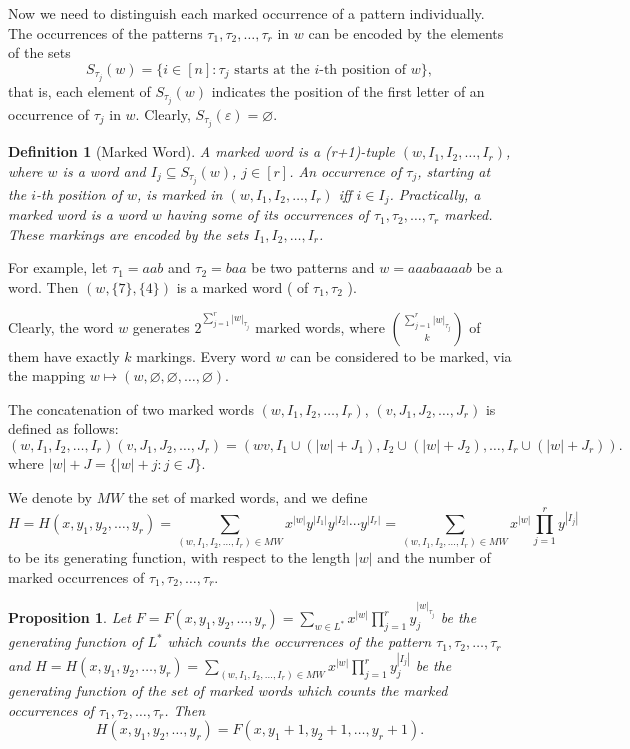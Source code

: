 \documentclass[12pt]{report}
\newtheorem{prop}{Proposition}
\newtheorem{defn}[mythm]{Definition}
\begin{document}
{{\noindent Now we need to distinguish each marked occurrence of a pattern individually. The occurrences of the patterns $\tau_1, \tau_2, \ldots, \tau_r$ in $w$ can be encoded by the elements of the sets
\[ S_{\tau_j}(w) = \{i \in [n]: \tau_j \textrm{ starts at the $i$-th position of $w$}\}, \]
that is, each element of $S_{\tau_j}(w)$ indicates the position of the first letter of an occurrence of $\tau_j$ in $w$. Clearly, $S_{\tau_j}(\varepsilon) = \varnothing$.
\begin{defn}[Marked Word]
A {\em marked word} is a (r+1)-tuple $(w, I_1, I_2, \ldots, I_r)$, where $w$ is a word and $I_j \subseteq S_{\tau_j}(w)$, $j \in [r]$. An occurrence of $\tau_j$, starting at the $i$-th position of $w$, is {\em marked} in $(w, I_1, I_2, \ldots, I_r)$ iff $i \in I_j$. Practically, a marked word is a word $w$ having some of its occurrences of $\tau_1, \tau_2, \ldots, \tau_r$ marked. These markings are encoded by the sets $I_1, I_2, \ldots, I_r$.
\end{defn}

For example, let $\tau_1= aab$ and $\tau_2=baa$ be two patterns and $w=aaabaaaab$ be a word. Then $(w,\{7\},\{4\})$ is a marked word ( of $\tau_1,\tau_2$ ).

Clearly, the word $w$ generates $2^{\sum\limits_{j=1}^r |w|_{\tau_j}}$ marked words, where $\binom{\sum\limits_{j=1}^r |w|_{\tau_j}}{k}$ of them have exactly $k$ markings. Every word $w$ can be considered to be marked, via the mapping $w \mapsto (w, \varnothing, \varnothing, \ldots, \varnothing)$.

The concatenation of two marked words $(w, I_1, I_2, \ldots, I_r)$, $(v, J_1, J_2, \ldots, J_r)$ is defined as follows:
\[ (w, I_1, I_2, \ldots, I_r)(v, J_1, J_2, \ldots, J_r) = (wv, I_1 \cup (|w| + J_1), I_2 \cup (|w| + J_2), \ldots, I_r \cup (|w| + J_r)). \]
where $|w| + J = \{|w| + j: j \in J\}$.


We denote by $MW$ the set of marked words, and we define
\[ H = H(x,y_1, y_2, \ldots, y_r) = \sum\limits_{(w,I_1, I_2, \ldots, I_r) \in MW} x^{|w|} y^{|I_1|} y^{|I_2|} \cdots y^{|I_r|} = \sum\limits_{(w,I_1, I_2, \ldots, I_r) \in MW} x^{|w|} \prod\limits_{j=1}^r y^{|I_j|} \]
to be its generating function, with respect to the length $|w|$ and the number of marked occurrences of $\tau_1, \tau_2, \ldots, \tau_r$. 

\begin{prop}
Let $F = F(x,y_1, y_2, \ldots, y_r) = \sum\limits_{w \in L^*} x^{|w|} \prod\limits_{j=1}^r y_j^{|w|_{\tau_j}}$ be the generating function of $L^*$ which counts the occurrences of the pattern $\tau_1, \tau_2, \ldots, \tau_r$ and $H = H(x,y_1, y_2, \ldots, y_r) = \sum\limits_{(w, I_1, I_2, \ldots, I_r) \in MW} x^{|w|} \prod\limits_{j=1}^r y_j^{|I_j|}$ be the generating function of the set of marked words which counts the marked occurrences of $\tau_1, \tau_2, \ldots, \tau_r$. Then
\[ H(x,y_1, y_2, \ldots, y_r) = F(x, y_1+1, y_2+1, \ldots, y_r+1). \]  
\end{prop}

}}
\end{document}
